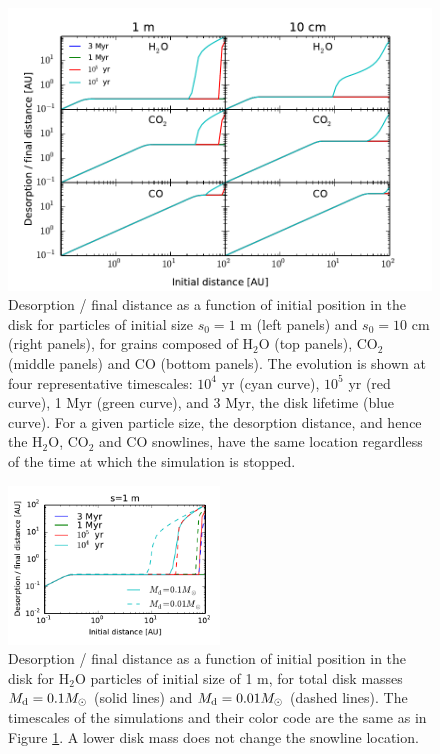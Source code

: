 \documentclass[apj]{emulateapj}
\begin{document}
\begin{figure}[t!]
\centering
\includegraphics[width=\textwidth]{../../figs/time_plots.pdf}
\caption{Desorption / final distance as a function of initial position in the disk for particles of initial size $s_0=1$ m (left panels) and $s_0=10$ cm (right panels), for grains composed of H$_2$O (top panels), CO$_2$ (middle panels) and CO (bottom panels). The evolution is shown at four representative timescales: $10^4$ yr (cyan curve), $10^5$ yr (red curve), 1 Myr (green curve), and 3 Myr, the disk lifetime (blue curve). For a given particle size, the desorption distance, and hence the H$_2$O, CO$_2$ and CO snowlines, have the same location regardless of the time at which the simulation is stopped.}
\label{fig:timeplots}
\end{figure}

\begin{figure}[h!]
\centering
\includegraphics[width=0.5\textwidth]{../../figs/desorption_distance_varying_Md.pdf}
\caption{Desorption / final distance as a function of initial position in the disk for H$_2$O particles of initial size of 1 m, for total disk masses $M_{\rm d}=0.1 M_{\odot}$ (solid lines) and $M_{\rm d}=0.01 M_{\odot}$ (dashed lines). The timescales of the simulations and their color code are the same as in Figure \ref{fig:timeplots}. A lower disk mass does not change the snowline location.}
\label{fig:varMd}
\end{figure}
\end{document}
